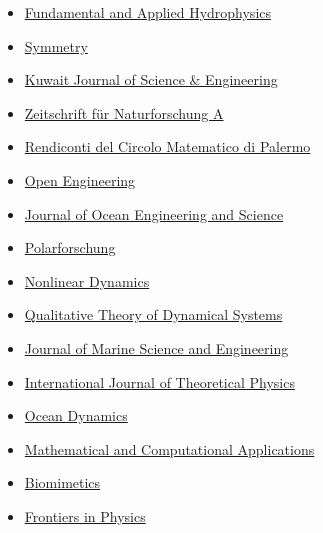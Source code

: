 \documentclass[final, a4paper, oneside, 12pt]{article}
\numberwithin{equation}{section}
\begin{document}
\begin{itemize}
    \item \href{http://hydrophysics.info/?lang=en}{Fundamental and Applied Hydrophysics}
    
    \item \href{http://www.mdpi.com/journal/symmetry}{Symmetry}
    
    \item \href{http://pubcouncil.kuniv.edu.kw/kjs/}{Kuwait Journal of Science \& Engineering}
    
    \item \href{http://www.degruyter.com/view/j/zna}{Zeitschrift f\"ur Naturforschung A}
    
    \item \href{http://www.springer.com/mathematics/journal/12215}{Rendiconti del Circolo Matematico di Palermo }
    
    \item \href{https://www.degruyter.com/view/j/eng}{Open Engineering}

    \item \href{https://www.sciencedirect.com/journal/journal-of-ocean-engineering-and-science/}{Journal of Ocean Engineering and Science}
    
    \item \href{http://www.polarforschung.de/}{Polarforschung}
    
    \item \href{https://link.springer.com/journal/11071}{Nonlinear Dynamics}

    \item \href{https://link.springer.com/journal/12346}{Qualitative Theory of Dynamical Systems}

    \item \href{https://www.mdpi.com/journal/jmse/}{Journal of Marine Science and Engineering}

    \item \href{https://link.springer.com/journal/10773/}{International Journal of Theoretical Physics}

    \item \href{https://link.springer.com/journal/10236/}{Ocean Dynamics}
    
    \item \href{https://www.mdpi.com/journal/mca/}{Mathematical and Computational Applications}

    \item \href{https://www.mdpi.com/journal/biomimetics/}{Biomimetics}

    \item \href{https://www.frontiersin.org/journals/physics/}{Frontiers in Physics}


\end{itemize}
\end{document}
